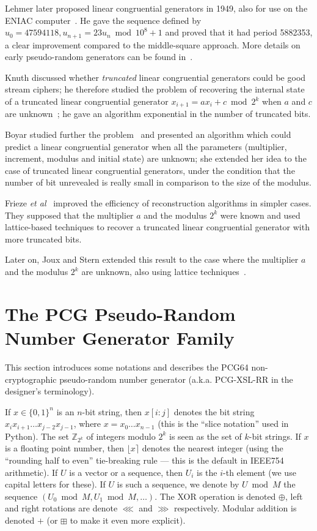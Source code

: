 \documentclass[submission,svgnames,journal=tosc]{iacrtrans}
\begin{document}
Lehmer later proposed linear congruential generators in 1949, also for use on
the ENIAC computer~\cite{Lehmer}. He gave the sequence defined by
$u_0 = 47594118, u_{n+1} = 23 u_n \bmod 10^8 + 1$ and proved that it had period
5882353, a clear improvement compared to the middle-square approach. More
details on early pseudo-random generators can be found in~\cite{Knuth}.

Knuth discussed whether \emph{truncated} linear congruential generators could be
good stream ciphers; he therefore studied the problem of recovering the internal
state of a truncated linear congruential generator
$x_{i+1} = ax_i + c \bmod 2^k$ when $a$ and $c$ are unknown~\cite{Knuth85}; he
gave an algorithm exponential in the number of truncated bits.

Boyar studied further the problem~\cite{Boyar1989} and presented an algorithm
which could predict a linear congruential generator when all the parameters
(multiplier, increment, modulus and initial state) are unknown; she extended her
idea to the case of truncated linear congruential generators, under the
condition that the number of bit unrevealed is really small in comparison to the
size of the modulus.

Frieze \textit{et al}~\cite{Frieze} improved the efficiency of reconstruction
algorithms in simpler cases. They supposed that the multiplier $a$ and the
modulus $2^k$ were known and used lattice-based techniques to recover a
truncated linear congruential generator with more truncated bits.

Later on, Joux and Stern extended this result to the case where the multiplier
$a$ and the modulus $2^k$ are unknown, also using lattice
techniques~\cite{JouxS98}.

\section{The PCG Pseudo-Random Number Generator Family}

This section introduces some notations and describes the \textsf{PCG64}
non-cryptographic pseudo-random number generator (a.k.a. \textsf{PCG-XSL-RR} in
the designer's terminology).

If $x \in \{0, 1\}^n$ is an $n$-bit string, then $x[i:j]$ denotes the bit string
$x_ix_{i+1}\dots x_{j-2}x_{j-1}$, where $x = x_0\dots x_{n-1}$ (this is the
``slice notation'' used in \textsf{Python}). The set $\mathbb{Z}_{2^k}$ of
integers modulo $2^k$ is seen as the set of $k$-bit strings. If $x$ is a
floating point number, then $\lfloor x \rceil$ denotes the nearest integer
(using the ``rounding half to even'' tie-breaking rule --- this is the default
in IEEE754 arithmetic). If $U$ is a vector or a sequence, then $U_i$ is the
$i$-th element (we use capital letters for these). If $U$ is such a sequence, we
denote by $U \bmod M$ the sequence $(U_0 \bmod M, U_1 \bmod M, \dots)$. The XOR
operation is denoted $\oplus$, left and right rotations are denote $\lll$ and
$\ggg$ respectively. Modular addition is denoted $+$ (or $\boxplus$ to make it
even more explicit).
\end{document}
